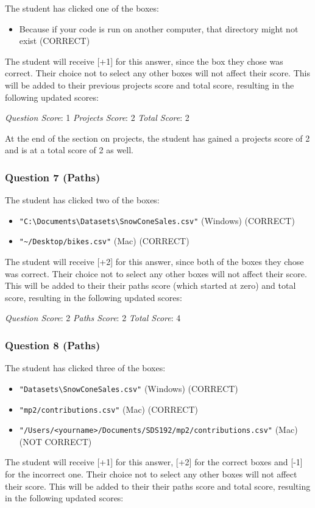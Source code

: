\documentclass[12pt,twoside]{reedthesis}
\providecommand{\tightlist}{%
  \setlength{\itemsep}{0pt}\setlength{\parskip}{0pt}}
\begin{document}
The student has clicked one of the boxes:
\begin{itemize}
\tightlist
\item
  Because if your code is run on another computer, that directory might not exist (CORRECT)
\end{itemize}
The student will receive {[}+1{]} for this answer, since the box they chose was correct. Their choice not to select any other boxes will not affect their score. This will be added to their previous projects score and total score, resulting in the following updated scores:

\emph{Question Score}: 1 \emph{Projects Score}: 2 \emph{Total Score}: 2

At the end of the section on projects, the student has gained a projects score of 2 and is at a total score of 2 as well.

\hypertarget{question-7-paths-1}{%
\subsubsection{Question 7 (Paths)}\label{question-7-paths-1}}

The student has clicked two of the boxes:
\begin{itemize}
\tightlist
\item
  \texttt{"C:\textbackslash{}Documents\textbackslash{}Datasets\textbackslash{}SnowConeSales.csv"} (Windows) (CORRECT)
\item
  \texttt{"\textasciitilde{}/Desktop/bikes.csv"} (Mac) (CORRECT)
\end{itemize}
The student will receive {[}+2{]} for this answer, since both of the boxes they chose was correct. Their choice not to select any other boxes will not affect their score. This will be added to their their paths score (which started at zero) and total score, resulting in the following updated scores:

\emph{Question Score}: 2 \emph{Paths Score}: 2 \emph{Total Score}: 4

\hypertarget{question-8-paths-1}{%
\subsubsection{Question 8 (Paths)}\label{question-8-paths-1}}

The student has clicked three of the boxes:
\begin{itemize}
\tightlist
\item
  \texttt{"Datasets\textbackslash{}SnowConeSales.csv"} (Windows) (CORRECT)
\item
  \texttt{"mp2/contributions.csv"} (Mac) (CORRECT)
\item
  \texttt{"/Users/\textless{}yourname\textgreater{}/Documents/SDS192/mp2/contributions.csv"} (Mac) (NOT CORRECT)
\end{itemize}
The student will receive {[}+1{]} for this answer, {[}+2{]} for the correct boxes and {[}-1{]} for the incorrect one. Their choice not to select any other boxes will not affect their score. This will be added to their their paths score and total score, resulting in the following updated scores:
\end{document}
